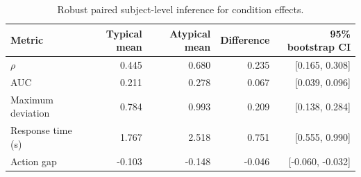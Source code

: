 \begin{table}[htbp]
\centering
\caption{Robust paired subject-level inference for condition effects.}
\label{tab:paired}
\begin{tabular}{l r r r r}
\toprule
Metric & Typical mean & Atypical mean & Difference & 95\% bootstrap CI \\
\midrule
$\rho$ & 0.445 & 0.680 & 0.235 & [0.165, 0.308] \\
AUC & 0.211 & 0.278 & 0.067 & [0.039, 0.096] \\
Maximum deviation & 0.784 & 0.993 & 0.209 & [0.138, 0.284] \\
Response time (s) & 1.767 & 2.518 & 0.751 & [0.555, 0.990] \\
Action gap & -0.103 & -0.148 & -0.046 & [-0.060, -0.032] \\
\bottomrule
\end{tabular}
\end{table}
